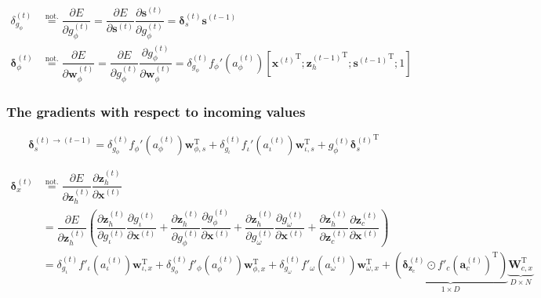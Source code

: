 \documentclass[11pt]{article}
\begin{document}
\begin{align}
  \delta_{g_{\phi}}^{(t)}
  & \overset{\text{not.}}{=}
    \dfrac{\partial E}{\partial g_{\phi}^{(t)}} =
    \dfrac{\partial E}{\partial \mathbf{s}^{(t)}}
    \dfrac{\partial \mathbf{s}^{(t)}}{\partial g_{\phi}^{(t)}} =
    \boldsymbol{\delta}_s^{(t)} \mathbf{s}^{(t-1)}
  \\
  \boldsymbol{\delta}_{\phi}^{(t)} &\overset{\text{not.}}{=} \dfrac{\partial E}{\partial \mathbf{w}_{\phi}^{(t)}} = \dfrac{\partial E}{\partial g_{\phi}^{(t)}} \dfrac{\partial g_{\phi}^{(t)}}{\partial \mathbf{w}_{\phi}^{(t)}} = \delta_{g_{\phi}}^{(t)} f_{\phi}'\left(a_{\phi}^{(t)}\right) \left[{\mathbf{x}^{(t)}}^{\text{T}}; {\mathbf{z}_{h}^{(t-1)}}^{\text{T}}; {\mathbf{s}^{(t-1)}}^{\text{T}}; 1\right]
\end{align}

\subsubsection*{The gradients with respect to incoming values}

\begin{equation}
  \label{eq:grad_s_t_t_minus_1}
  \boldsymbol{\delta}^{(t) \rightarrow (t-1)}_s = 
  \delta_{g_{\phi}}^{(t)}f_{\phi}'\left(a_{\phi}^{(t)}\right)\mathbf{w}_{\phi,
    s}^{\text{T}} +
  \delta_{g_{\iota}}^{(t)}f_{\iota}'\left(a_{\iota}^{(t)}\right)\mathbf{w}_{\iota,
    s}^{\text{T}} +
  g_{\phi}^{(t)}{\boldsymbol{\delta}_{s}^{(t)}}^{\text{T}}
\end{equation}

\begin{equation}
  \begin{split}
    \boldsymbol{\delta}_x^{(t)}
    & \overset{\text{not.}}{=}
    \dfrac{\partial E}{\partial \mathbf{z}_h^{(t)}} \dfrac{\partial
      \mathbf{z}_h^{(t)}}{\partial \mathbf{x}^{(t)}}
    \\
    & =
    \dfrac{\partial E}{\partial \mathbf{z}_h^{(t)}}
    \left(
      \dfrac{\partial \mathbf{z}_h^{(t)}}{\partial g_{\iota}^{(t)}}
      \dfrac{\partial g_{\iota}^{(t)}}{\partial \mathbf{x}^{(t)}}
      +
      \dfrac{\partial \mathbf{z}_h^{(t)}}{\partial g_{\phi}^{(t)}}
      \dfrac{\partial g_{\phi}^{(t)}}{\partial \mathbf{x}^{(t)}}
      +
      \dfrac{\partial \mathbf{z}_h^{(t)}}{\partial g_{\omega}^{(t)}}
      \dfrac{\partial g_{\omega}^{(t)}}{\partial \mathbf{x}^{(t)}}
      +
      \dfrac{\partial \mathbf{z}_h^{(t)}}{\partial \mathbf{z}_{c}^{(t)}}
      \dfrac{\partial \mathbf{z}_{c}^{(t)}}{\partial \mathbf{x}^{(t)}}
    \right)
    \\
    & =
    \delta_{g_{\iota}}^{(t)} f'_{\iota}\left(a_{\iota}^{(t)}\right)
    \mathbf{w}_{\iota, x}^{\text{T}} + \delta_{g_{\phi}}^{(t)}
    f'_{\phi}\left(a_{\phi}^{(t)}\right) \mathbf{w}_{\phi, x}^{\text{T}} +
    \delta_{g_{\omega}}^{(t)} f'_{\omega}\left(a_{\omega}^{(t)}\right)
    \mathbf{w}_{\omega, x}^{\text{T}} + \underbrace{\left(\boldsymbol{\delta}_{\mathbf{z}_c}^{(t)} \odot
        {f'_{c}\left(\mathbf{a}_{c}^{(t)}\right)}^{\text{T}}\right)}_{1 \times D} \underbrace{\mathbf{W}_{c, x}^{\text{T}}}_{D \times N}
  \end{split}
\end{equation}
\end{document}
